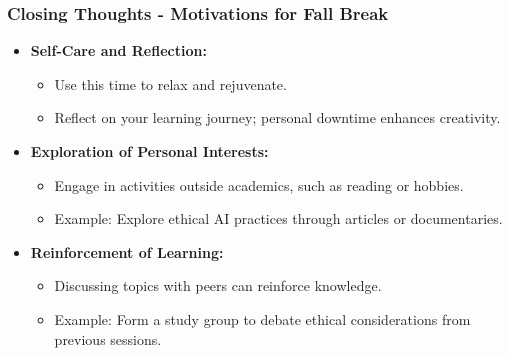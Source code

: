 \documentclass[aspectratio=169]{beamer}
\begin{document}
\begin{frame}[fragile]
    \frametitle{Closing Thoughts - Motivations for Fall Break}
    \begin{itemize}
        \item \textbf{Self-Care and Reflection:}
            \begin{itemize}
                \item Use this time to relax and rejuvenate.
                \item Reflect on your learning journey; personal downtime enhances creativity.
            \end{itemize}
        \item \textbf{Exploration of Personal Interests:}
            \begin{itemize}
                \item Engage in activities outside academics, such as reading or hobbies.
                \item Example: Explore ethical AI practices through articles or documentaries.
            \end{itemize}
        \item \textbf{Reinforcement of Learning:}
            \begin{itemize}
                \item Discussing topics with peers can reinforce knowledge.
                \item Example: Form a study group to debate ethical considerations from previous sessions.
            \end{itemize}
    \end{itemize}
\end{frame}
\end{document}
